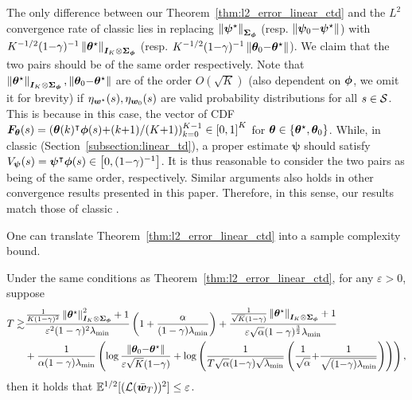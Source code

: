 \begin{remark}\label{remark:theory_match}
The only difference between our Theorem~\ref{thm:l2_error_linear_ctd} and the $L^2$ convergence rate of classic {\LTD} \citep[Theorem~3][]{samsonov2024improved} lies in replacing $\left\|{\bm{\psi}^{\star}}\right\|_{{\bm{\Sigma}}_{{\bm{\phi}}}}$ (resp. $\left\|{\bm{\psi}_0{-}\bm{\psi}^{\star}}\right\|$) with $K^{-1/2}(1{-}\gamma)^{-1}\left\|{{\bm{\theta}}^{\star}}\right\|_{{\bm{I}}_K\otimes{\bm{\Sigma}}_{{\bm{\phi}}}}$ (resp. $K^{-1/2}(1{-}\gamma)^{-1}\left\|{{\bm{\theta}}_0{-}{\bm{\theta}}^{\star}}\right\|$). 
We claim that the two pairs should be of the same order respectively.
Note that $\left\|{{\bm{\theta}}^{\star}}\right\|_{{\bm{I}}_K\otimes{\bm{\Sigma}}_{{\bm{\phi}}}},\left\|{{\bm{\theta}}_0{-}{\bm{\theta}}^{\star}}\right\|$ are of the order $O(\sqrt{K})$ (also dependent on ${\bm{\phi}}$, we omit it for brevity) if ${\eta}_{{\bm{w}}^{\star}}(s), {\eta}_{{\bm{w}}_0}(s)$ are valid probability distributions for all $s\in{\mathcal{S}}$.
This is because in this case, the vector of CDF ${\bm{F}}_{{\bm{\theta}}}(s)=({\bm{\theta}}(k)^\intercal{\bm{\phi}}(s){+}({k{+}1})/({K{+}1}))_{k=0}^{K{-}1}\in \left[{0, 1}\right]^K$ for ${\bm{\theta}}\in\left\{{{\bm{\theta}}^{\star}, {\bm{\theta}}_0}\right\}$.
While, in classic {\LTD} (Section~\ref{subsection:linear_td}), a proper estimate $\bm{\psi}$ should satisfy $V_{\bm{\psi}}(s)={\bm{\psi}}^{\intercal}{\bm{\phi}}(s)\in\left[{0,(1{-}\gamma)^{-1}}\right]$.
It is thus reasonable to consider the two pairs as being of the same order, respectively.
Similar arguments also holds in other convergence results presented in this paper.
Therefore, in this sense, our results match those of classic {\LTD}.
\end{remark}
One can translate Theorem~\ref{thm:l2_error_linear_ctd} into a sample complexity bound.
\begin{corollary}\label{coro:l2_sample_complexity_linear_ctd}
Under the same conditions as Theorem~\ref{thm:l2_error_linear_ctd}, for any $\varepsilon>0$, suppose
    \begin{equation*}
    \begin{aligned}
        T\gtrsim&\frac{\frac{1}{K(1-\gamma)^2}\left\|{{\bm{\theta}}^{\star}}\right\|^2_{{\bm{I}}_K\otimes{\bm{\Sigma}}_{{\bm{\phi}}}}+1}{\varepsilon^2(1-\gamma)^2\lambda_{\min}}\left({1+\frac{\alpha}{(1-\gamma)\lambda_{\min}}}\right) +\frac{\frac{1}{\sqrt{K}(1-\gamma)}\left\|{{\bm{\theta}}^{\star}}\right\|_{{\bm{I}}_K\otimes{\bm{\Sigma}}_{{\bm{\phi}}}}+1}{\varepsilon\sqrt{\alpha }(1-\gamma)^{\frac{3}{2}}\lambda_{\min}}\\
        &+\frac{1}{\alpha (1-\gamma) \lambda_{\min}}\left({\log\frac{\left\|{{\bm{\theta}}_0{-}{\bm{\theta}}^{\star}}\right\|}{\varepsilon\sqrt{K}(1{-}\gamma)}+\log\left({ \frac{1}{T \sqrt{\alpha}(1{-}\gamma)\sqrt{\lambda_{\min}}}\left({\frac{1}{\sqrt\alpha}{+}\frac{1}{\sqrt{ (1{-}\gamma)\lambda_{\min}}}}\right)}\right)}\right),   
    \end{aligned}
    \end{equation*}
    then it holds that $ {\mathbb E}^{1/2}[({\mathcal{L}}(\bar{{\bm{w}}}_T))^2]\leq \varepsilon$.
\end{corollary}
